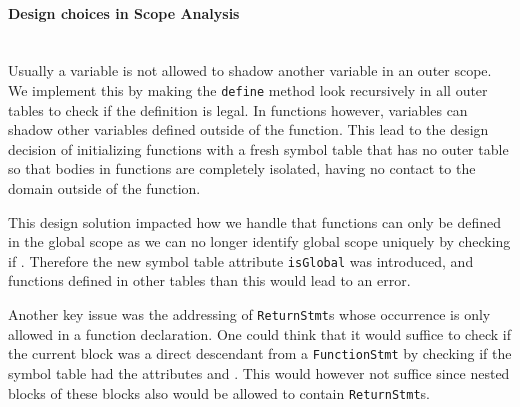 \paragraph{Design choices in Scope Analysis}\mbox{}\\
Usually a variable is not allowed to shadow another variable in an outer scope. We implement this by making the \verb|define| method look recursively in all outer tables
to check if the definition is legal.
In functions however, variables can shadow other variables defined outside of the function. This lead to the design decision of initializing functions with a fresh symbol table that has no outer table
so that bodies in functions are completely isolated, having no contact to the domain outside of the function.

This design solution impacted how we handle that functions can only be defined in the global scope as we can no longer identify global scope uniquely by checking if .
Therefore the new symbol table attribute \verb|isGlobal| was introduced, and functions defined in other tables than this would lead to an error.

Another key issue was the addressing of \verb|ReturnStmt|s whose occurrence is only allowed in a function declaration. One could think that it would suffice to check if the current block 
was a direct descendant from a \verb|FunctionStmt| by checking if the symbol table had the attributes  and .
This would however not suffice since nested blocks of these blocks also would be allowed to contain \verb|ReturnStmt|s.

